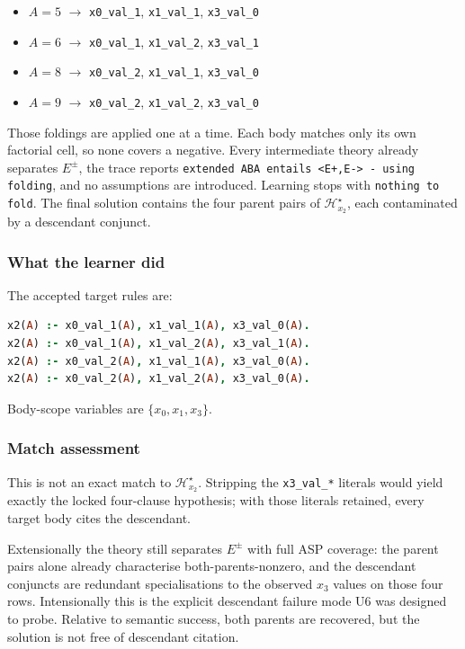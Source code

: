 \documentclass[11pt]{article}
\begin{document}
\begin{itemize}
  \item \(A=5\) \(\rightarrow\) \texttt{x0\_val\_1}, \texttt{x1\_val\_1}, \texttt{x3\_val\_0}
  \item \(A=6\) \(\rightarrow\) \texttt{x0\_val\_1}, \texttt{x1\_val\_2}, \texttt{x3\_val\_1}
  \item \(A=8\) \(\rightarrow\) \texttt{x0\_val\_2}, \texttt{x1\_val\_1}, \texttt{x3\_val\_0}
  \item \(A=9\) \(\rightarrow\) \texttt{x0\_val\_2}, \texttt{x1\_val\_2}, \texttt{x3\_val\_0}
\end{itemize}

Those foldings are applied one at a time. Each body matches only its own factorial cell, so none covers a negative. Every intermediate theory already separates \(E^\pm\), the trace reports \texttt{extended ABA entails <E+,E-> - using folding}, and no assumptions are introduced. Learning stops with \texttt{nothing to fold}. The final solution contains the four parent pairs of \(\mathcal{H}_{x_2}^\star\), each contaminated by a descendant conjunct.

\subsubsection{What the learner did}

The accepted target rules are:

\begin{lstlisting}[style=logic,language=Prolog]
x2(A) :- x0_val_1(A), x1_val_1(A), x3_val_0(A).
x2(A) :- x0_val_1(A), x1_val_2(A), x3_val_1(A).
x2(A) :- x0_val_2(A), x1_val_1(A), x3_val_0(A).
x2(A) :- x0_val_2(A), x1_val_2(A), x3_val_0(A).
\end{lstlisting}

Body-scope variables are \(\{x_0,x_1,x_3\}\).

\subsubsection{Match assessment}

This is not an exact match to \(\mathcal{H}_{x_2}^\star\). Stripping the \texttt{x3\_val\_*} literals would yield exactly the locked four-clause hypothesis; with those literals retained, every target body cites the descendant.

Extensionally the theory still separates \(E^\pm\) with full ASP coverage: the parent pairs alone already characterise both-parents-nonzero, and the descendant conjuncts are redundant specialisations to the observed \(x_3\) values on those four rows. Intensionally this is the explicit descendant failure mode U6 was designed to probe. Relative to semantic success, both parents are recovered, but the solution is not free of descendant citation.
\end{document}

